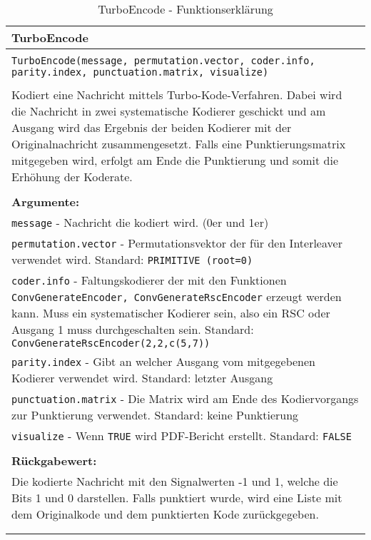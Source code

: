 \begin{longtable}{|p{\textwidth}|}
\hline
\rowcolor{lightblue}TurboEncode\\
\hline
\\
\texttt{TurboEncode(message, permutation.vector, coder.info, parity.index, punctuation.matrix, visualize)}\\
\\
Kodiert eine Nachricht mittels Turbo-Kode-Verfahren. Dabei wird die Nachricht in zwei systematische Kodierer geschickt und am Ausgang wird das Ergebnis der beiden Kodierer mit der Originalnachricht zusammengesetzt. Falls eine Punktierungsmatrix mitgegeben wird, erfolgt am Ende die Punktierung und somit die Erhöhung der Koderate.\\
\\
\textbf{Argumente:}\\
\texttt{message} - Nachricht die kodiert wird. (0er und 1er)\\
\texttt{permutation.vector} - Permutationsvektor der für den Interleaver verwendet wird. Standard: \texttt{PRIMITIVE (root=0)}\\
\texttt{coder.info} - Faltungskodierer der mit den Funktionen \texttt{ConvGenerateEncoder, ConvGenerateRscEncoder} erzeugt werden kann. Muss ein systematischer Kodierer sein, also ein RSC oder Ausgang 1 muss durchgeschalten sein. Standard: \texttt{ConvGenerateRscEncoder(2,2,c(5,7))}\\
\texttt{parity.index} - Gibt an welcher Ausgang vom mitgegebenen Kodierer verwendet wird. Standard: letzter Ausgang\\
\texttt{punctuation.matrix} - Die Matrix wird am Ende des Kodiervorgangs zur Punktierung verwendet. Standard: keine Punktierung\\
\texttt{visualize} - Wenn \texttt{TRUE} wird PDF-Bericht erstellt. Standard: \texttt{FALSE}\\
\\
\textbf{Rückgabewert:}\\
Die kodierte Nachricht mit den Signalwerten -1 und 1, welche die Bits 1 und 0 darstellen. Falls punktiert wurde, wird eine Liste mit dem Originalkode und dem punktierten Kode zurückgegeben.\\
\\
\hline
\caption[TurboEncode]{TurboEncode - Funktionserklärung}
\end{longtable}
